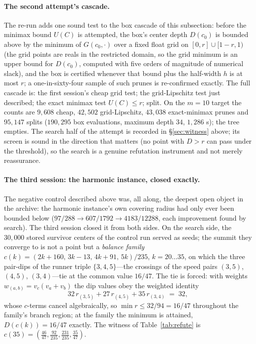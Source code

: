 \paragraph{The second attempt's cascade.}
The re-run adds one sound test to the box cascade of this subsection:
before the minimax bound $U(C)$ is attempted, the box's center depth
$D(c_0)$ is bounded above by the minimum of $G(c_0,\cdot)$ over a
fixed float grid on $[0,r]\cup[1-r,1)$ (the grid points are reals in
the restricted domain, so the grid minimum is an upper bound for
$D(c_0)$, computed with five orders of magnitude of numerical slack),
and the box is certified whenever that bound plus the half-width $h$
is at most $r$; a one-in-sixty-four sample of such prunes is
re-confirmed exactly. The full cascade is: the first session's cheap
grid test; the grid-Lipschitz test just described; the exact minimax
test $U(C)\le r$; split. On the $m=10$ target the counts are
$9{,}608$ cheap, $42{,}502$ grid-Lipschitz, $43{,}038$ exact-minimax
prunes and $95{,}147$ splits ($190{,}295$ box evaluations, maximum
depth $34$, $1{,}286$ s); the tree empties. The search half of the
attempt is recorded in \S\ref{sec:witness} above; its screen is sound
in the direction that matters (no point with $D>r$ can pass under the
threshold), so the search is a genuine refutation instrument and not
merely reassurance.

\paragraph{The third session: the harmonic instance, closed exactly.}
The negative control described above was, all along, the deepest open
object in the archive: the harmonic instance's own covering radius had
only ever been bounded below
($97/288\to607/1792\to4183/12288$, each improvement found by search).
The third session closed it from both sides. On the search side, the
$30{,}000$ stored survivor centers of the control run served as seeds;
the summit they converge to is not a point but a \emph{balance family}
$c(k)=(2k{+}160,\,3k{-}13,\,4k{+}91,\,5k)/235$, $k=20\dots35$, on
which the three pair-dips of the runner triple $\{3,4,5\}$---the
crossings of the speed pairs $(3,5)$, $(4,5)$, $(3,4)$---tie at the
common value $16/47$. The tie is forced: with weights
$w_{(a,b)}=v_c(v_a{+}v_b)$ the dip values obey the weighted identity
\[
32\,r_{(3,5)}+27\,r_{(4,5)}+35\,r_{(3,4)}\;=\;32,
\]
whose $c$-terms cancel algebraically, so
$\min r\le 32/94=16/47$ throughout the family's branch region; at the
family the minimum is attained, $D(c(k))=16/47$ exactly. The witness of
Table~\ref{tab:refute} is $c(35)=(\tfrac{46}{47},\tfrac{92}{235},
\tfrac{231}{235},\tfrac{35}{47})$.

